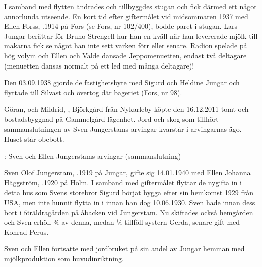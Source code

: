 I samband med flytten ändrades och tillbyggdes stugan och fick därmed ett något annorlunda utseende. En kort tid efter giftermålet vid midsommaren 1937 med Ellen Forss, .1914 på Fors (se Fors, nr 102/400), bodde paret i stugan. Lars Jungar berättar för Bruno Strengell hur han en kväll när han levererade mjölk till makarna fick se något han inte sett varken förr eller senare. Radion spelade på hög volym och Ellen och Valde dansade Jeppomenuetten, endast två deltagare (menuetten dansas normalt på ett led med många deltagare)!

Den 03.09.1938 gjorde de fastighetsbyte med Sigurd och Heldine Jungar och flyttade till Silvast och övertog där bageriet (Fors, nr 98).






Göran,  och Mildrid, , Björkgård från Nykarleby köpte den 16.12.2011 tomt och bostadsbyggnad på Gammelgård lägenhet. Jord och skog som tillhört sammanslutningen av Sven Jungerstams arvingar kvarstår i arvingarnas ägo. Huset står obebott.


: Sven och Ellen Jungerstams arvingar (sammanslutning)


Sven Olof Jungerstam, .1919 på Jungar, gifte sig 14.01.1940 med Ellen Johanna Häggström, .1920 på Holm. I samband med giftermålet flyttar de nygifta in i detta hus som Svens storebror Sigurd börjat bygga efter sin hemkomst 1929 från USA, men inte hunnit flytta in i innan han dog 10.06.1930. Sven hade innan dess bott i föräldragården på åbacken vid Jungerstam. Nu skiftades också hemgården och Sven erhöll ¾ av denna, medan ¼ tillföll systern Gerda, senare gift med Konrad Perus.

Sven och Ellen fortsatte med jordbruket på sin andel av Jungar hemman med mjölkproduktion som huvudinriktning.
\begin{jhchildren}
  \item {}
  \item {}
  \item {}
\end{jhchildren}

